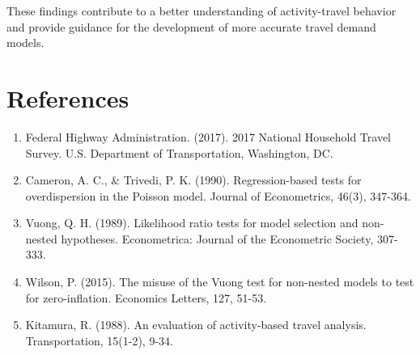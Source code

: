 \documentclass[12pt]{article}
\begin{document}
These findings contribute to a better understanding of activity-travel behavior and provide guidance for the development of more accurate travel demand models.

\section{References}

\begin{enumerate}
\item Federal Highway Administration. (2017). 2017 National Household Travel Survey. U.S. Department of Transportation, Washington, DC.
\item Cameron, A. C., \& Trivedi, P. K. (1990). Regression-based tests for overdispersion in the Poisson model. Journal of Econometrics, 46(3), 347-364.
\item Vuong, Q. H. (1989). Likelihood ratio tests for model selection and non-nested hypotheses. Econometrica: Journal of the Econometric Society, 307-333.
\item Wilson, P. (2015). The misuse of the Vuong test for non-nested models to test for zero-inflation. Economics Letters, 127, 51-53.
\item Kitamura, R. (1988). An evaluation of activity-based travel analysis. Transportation, 15(1-2), 9-34.
\end{enumerate}
\end{document}
